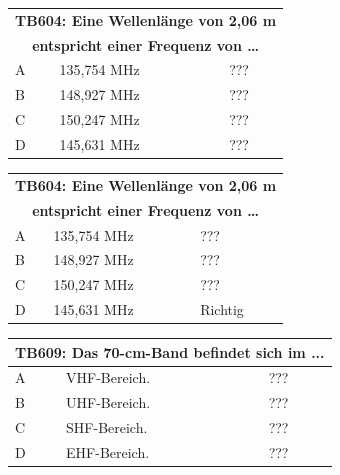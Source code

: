 \begin{frame}
	\begin{center}
	\begin{tabular}{|l|l|l|}
		\hline
		\multicolumn{3}{|c|}{\textbf{TB604: Eine Wellenlänge von 2,06 m}}\\
		\multicolumn{3}{|c|}{\textbf{entspricht einer Frequenz von …}}\\
		\hline
		A & 135,754 MHz & ??? \\ \hline
		B & 148,927 MHz & ??? \\ \hline
		C & 150,247 MHz & ??? \\ \hline
		D & 145,631 MHz & ??? \\ \hline
	\end{tabular}
	\end{center}
\end{frame}

\begin{frame}
	\begin{center}
	\begin{tabular}{|l|l|l|}
		\hline
		\multicolumn{3}{|c|}{\textbf{TB604: Eine Wellenlänge von 2,06 m}}\\
		\multicolumn{3}{|c|}{\textbf{entspricht einer Frequenz von …}}\\
		\hline
		A & 135,754 MHz & ??? \\ \hline
		B & 148,927 MHz & ??? \\ \hline
		C & 150,247 MHz & ??? \\ \hline
		D & 145,631 MHz & Richtig \\ \hline
	\end{tabular}
	\end{center}
\end{frame}

\begin{frame}
	\begin{center}
	\begin{tabular}{|l|l|l|}
		\hline
		\multicolumn{3}{|c|}{\textbf{TB609: Das 70-cm-Band befindet sich im ...}}\\
		\hline
		A & VHF-Bereich. & ??? \\ \hline
		B & UHF-Bereich. & ??? \\ \hline
		C & SHF-Bereich. & ??? \\ \hline
		D & EHF-Bereich. & ??? \\ \hline
	\end{tabular}
	\end{center}
\end{frame}

